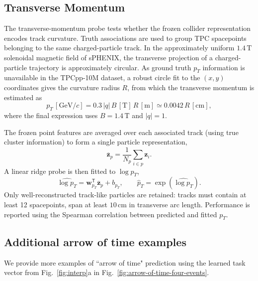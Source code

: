   \subsection{Transverse Momentum}
  \label{sec:pt}

  The transverse-momentum probe tests whether the frozen collider representation encodes track curvature. Truth associations are used to group TPC
  spacepoints belonging to the same charged-particle track. In the approximately uniform \(1.4\,\mathrm{T}\) solenoidal magnetic field of sPHENIX, the
  transverse projection of a charged-particle trajectory is approximately circular. As ground truth $p_T$ information is unavailable in the TPCpp-10M dataset, a robust circle fit to the \((x,y)\) coordinates gives the curvature
  radius \(R\), from which the transverse momentum is estimated as
  \begin{equation}
      p_T\,[\mathrm{GeV}/c]
      = 0.3\,|q|\,B\,[\mathrm{T}]\,R\,[\mathrm{m}]
      \simeq 0.0042\,R\,[\mathrm{cm}],
  \end{equation}
  where the final expression uses \(B=1.4\,\mathrm{T}\) and \(|q|=1\). 

  The frozen point features are averaged over each associated track (using true cluster information) to form a single particle representation,
  \begin{equation}
      \overline{\mathbf{z}}_p
      = \frac{1}{N_p}\sum_{i\in p}\mathbf{z}_i.
  \end{equation}
  A linear ridge probe is then fitted to \(\log p_T\),
  \begin{equation}
      \widehat{\log p_T}
      = \mathbf{w}_{p_T}^{\mathsf T}\overline{\mathbf{z}}_p+b_{p_T},
      \qquad
      \hat{p}_T=\exp\!\left(\widehat{\log p_T}\right).
  \end{equation}
  Only well-reconstructed track-like particles are retained: tracks must contain at least 12 spacepoints, span at least \(10\,\mathrm{cm}\) in transverse
  arc length. Performance is reported using the Spearman correlation between predicted
  and fitted \(p_T\).

  
\subsection{Additional arrow of time examples}

We provide more examples of ``arrow of time" prediction using the learned task vector from Fig.~\ref{fig:interp}a in Fig.~\ref{fig:arrow-of-time-four-events}.

